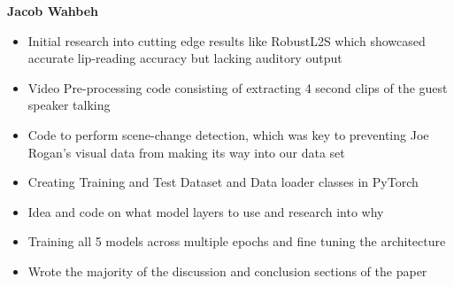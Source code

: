 \documentclass[10pt,twocolumn,letterpaper]{article}
\begin{document}
\textbf{{Jacob Wahbeh}}
\begin{itemize}
    \item Initial research into cutting edge results like RobustL2S which showcased accurate lip-reading accuracy but lacking auditory output
    \item Video Pre-processing code consisting of extracting 4 second clips of the guest speaker talking
    \item Code to perform scene-change detection, which was key to preventing Joe Rogan's visual data from making its way into our data set
    \item Creating Training and Test Dataset and Data loader classes in PyTorch
    \item Idea and code on what model layers to use and research into why
    \item Training all 5 models across multiple epochs and fine tuning the architecture
    \item Wrote the majority of the discussion and conclusion sections of the paper
\end{itemize}











{\small


}
\end{document}
